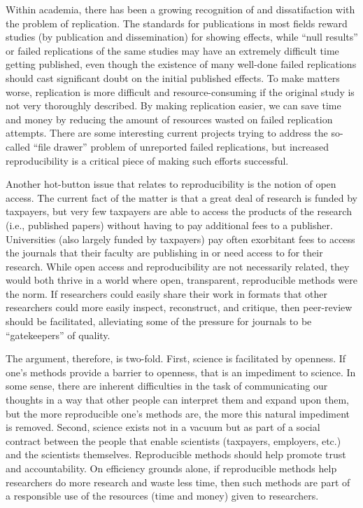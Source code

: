 \documentclass{book}
\begin{document}
Within academia, there has been a growing recognition of and dissatifaction with the problem of replication. The standards for publications in most fields reward studies (by publication and dissemination) for showing effects, while ``null results'' or failed replications of the same studies may have an extremely difficult time getting published, even though the existence of many well-done failed replications should cast significant doubt on the initial published effects. To make matters worse, replication is more difficult and resource-consuming if the original study is not very thoroughly described. By making replication easier, we can save time and money by reducing the amount of resources wasted on failed replication attempts. There are some interesting current projects trying to address the so-called ``file drawer'' problem of unreported failed replications, but increased reproducibility is a critical piece of making such efforts successful.

Another hot-button issue that relates to reproducibility is the notion of open access. The current fact of the matter is that a great deal of research is funded by taxpayers, but very few taxpayers are able to access the products of the research (i.e., published papers) without having to pay additional fees to a publisher.  Universities (also largely funded by taxpayers) pay often exorbitant fees to access the journals that their faculty are publishing in or need access to for their research.  While open access and reproducibility are not necessarily related, they would both thrive in a world where open, transparent, reproducible methods were the norm. If researchers could easily share their work in formats that other researchers could more easily inspect, reconstruct, and critique, then peer-review should be facilitated, alleviating some of the pressure for journals to be ``gatekeepers'' of quality.

The argument, therefore, is two-fold.  First, science is facilitated by openness.  If one's methods provide a barrier to openness, that is an impediment to science. In some sense, there are inherent difficulties in the task of communicating our thoughts in a way that other people can interpret them and expand upon them, but the more reproducible one's methods are, the more this natural impediment is removed. Second, science exists not in a vacuum but as part of a social contract between the people that enable scientists (taxpayers, employers, etc.) and the scientists themselves. Reproducible methods should help promote trust and accountability. On efficiency grounds alone, if reproducible methods help researchers do more research and waste less time, then such methods are part of a responsible use of the resources (time and money) given to researchers. 
\end{document}
